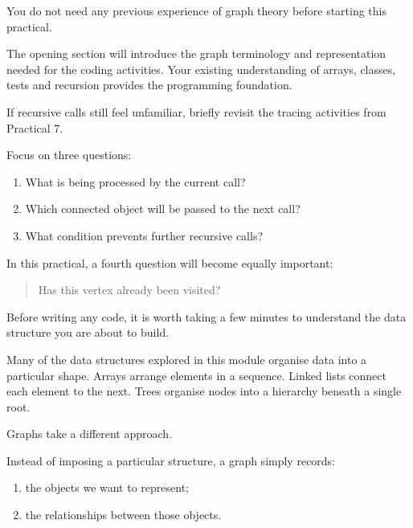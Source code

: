 \documentclass{csc2059practical}
\begin{document}
\begin{importantnote}
You do not need any previous experience of graph theory before starting this
practical.

The opening section will introduce the graph terminology and representation
needed for the coding activities. Your existing understanding of arrays,
classes, tests and recursion provides the programming foundation.
\end{importantnote}

\begin{tipbox}
If recursive calls still feel unfamiliar, briefly revisit the tracing
activities from Practical 7.

Focus on three questions:

\begin{enumerate}
\item What is being processed by the current call?
\item Which connected object will be passed to the next call?
\item What condition prevents further recursive calls?
\end{enumerate}

In this practical, a fourth question will become equally important:

\begin{quote}
Has this vertex already been visited?
\end{quote}
\end{tipbox}



Before writing any code, it is worth taking a few minutes to understand the data
structure you are about to build.

Many of the data structures explored in this module organise data into a
particular shape. Arrays arrange elements in a sequence. Linked lists connect
each element to the next. Trees organise nodes into a hierarchy beneath a single
root.

Graphs take a different approach.

Instead of imposing a particular structure, a graph simply records:

\begin{enumerate}
\item the objects we want to represent;
\item the relationships between those objects.
\end{enumerate}
\end{document}
